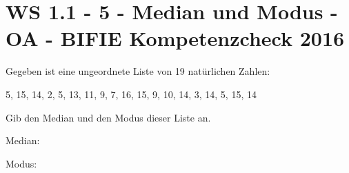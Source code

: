 \section{WS 1.1 - 5 - Median und Modus - OA - BIFIE Kompetenzcheck 2016}

\begin{beispiel}[WS 1.1]{1} %
				Gegeben ist eine ungeordnete Liste von 19 natürlichen Zahlen:
				
5, 15, 14, 2, 5, 13, 11, 9, 7, 16, 15, 9, 10, 14, 3, 14, 5, 15, 14

Gib den Median und den Modus dieser Liste an.

Median:

Modus:

\end{beispiel}